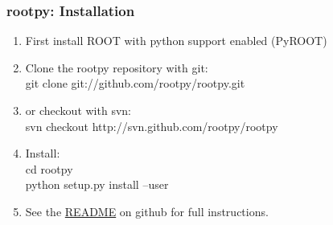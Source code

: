 \documentclass[hyperref={pdfpagelabels=false},professionalfonts,10pt,serif,table,xcolor=dvipsnames]{beamer}
\begin{document}

\begin{frame}[fragile]
    \frametitle{rootpy: Installation}

    \begin{enumerate}
        \itemsep=.3cm
        \item First install ROOT with python support enabled (PyROOT)
        \item Clone the rootpy repository with git:\\
            \hspace{1cm} git clone git://github.com/rootpy/rootpy.git
        \item or checkout with svn:\\
            \hspace{1cm} svn checkout http://svn.github.com/rootpy/rootpy
        \item Install:\\
            \hspace{1cm} cd rootpy\\
            \hspace{1cm} python setup.py install --user
        \item See the
                \href{https://github.com/rootpy/rootpy/blob/master/README.rst}{README} on github for full instructions.
    \end{enumerate}
\end{frame}
\end{document}
